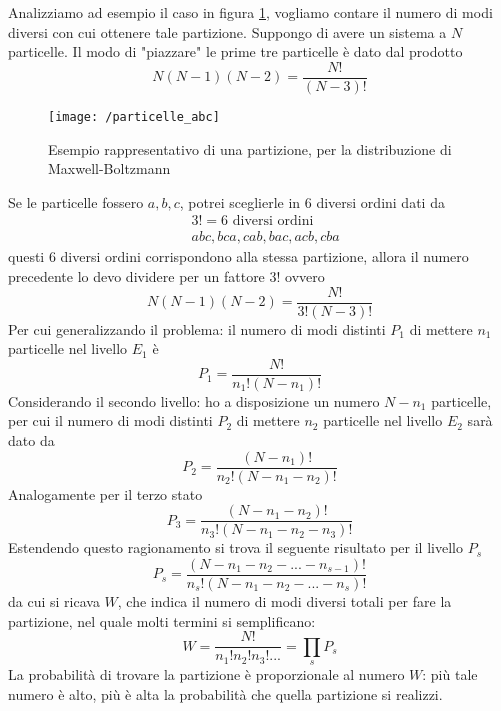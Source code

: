 Analizziamo ad esempio il caso in figura \ref{esempio_partizione}, vogliamo contare il numero di modi diversi con cui ottenere tale partizione.
Suppongo di avere un sistema a $N$ particelle.
Il modo di "piazzare" le prime tre particelle è dato dal prodotto
\begin{equation}
N (N-1) (N-2) = \frac{N!}{(N-3)!}
\end{equation}
\begin{figure}[h]
\centering
\texttt{[image: /particelle\_abc]}
\caption{Esempio rappresentativo di una partizione, per la distribuzione di Maxwell-Boltzmann}
\label{esempio_partizione}
\end{figure}
Se le particelle fossero $a,b,c$, potrei sceglierle in 6 diversi ordini dati da
\begin{equation}
\begin{split}
& 3! = 6 \mbox{ diversi ordini} \\
& abc, bca, cab, bac, acb, cba
\end{split}
\end{equation}
questi 6 diversi ordini corrispondono alla stessa partizione, allora il numero precedente lo devo dividere per un fattore $3!$ ovvero
\begin{equation}
N (N-1) (N-2) = \frac{N!}{3!(N-3)!}
\end{equation}
Per cui generalizzando il problema: il numero di modi distinti $P_1$ di mettere $n_1$ particelle nel livello $E_1$ è
\begin{equation}
P_1 = \frac{ N!}{n_1! (N-n_1)! }
\label{stat_class}
\end{equation}
Considerando il secondo livello: ho a disposizione un numero $N-n_1$ particelle, per cui il numero di modi distinti $P_2$ di mettere $n_2$ particelle nel livello $E_2$ sarà dato da
\begin{equation}
P_2 = \frac{ (N-n_1)!}{n_2! (N-n_1-n_2)! }
\end{equation}
Analogamente per il terzo stato
\begin{equation}
P_3 = \frac{(N-n_1 - n_2)!}{n_3! ( N - n_1 - n_2 - n_3)!}
\end{equation}
Estendendo questo ragionamento si trova il seguente risultato per il livello $P_s$
\begin{equation}
P_s = \frac{(N-n_1 - n_2 - ... - n_{s-1})!}{n_s! ( N - n_1 - n_2 - ... - n_{s})!}
\end{equation}
da cui si ricava $W$, che indica il numero di modi diversi totali per fare la partizione, nel quale molti termini si semplificano:
\begin{equation}
W =  \frac{N!}{n_1! n_2! n_3! ... } = \prod_s P_s
\end{equation}
La probabilità di trovare la partizione è proporzionale al numero $W$: più tale numero è alto, più è alta la probabilità che quella partizione si realizzi.

